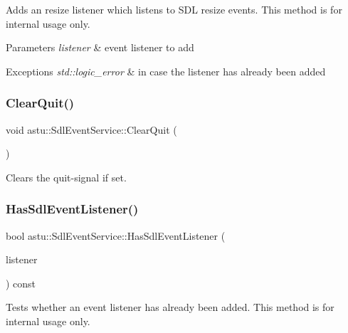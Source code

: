 Adds an resize listener which listens to S\+DL resize events. This method is for internal usage only.


\begin{DoxyParams}{Parameters}
{\em listener} & event listener to add \\
\hline
\end{DoxyParams}

\begin{DoxyExceptions}{Exceptions}
{\em std\+::logic\+\_\+error} & in case the listener has already been added \\
\hline
\end{DoxyExceptions}
\mbox{\label{classastu_1_1SdlEventService_afe744162d9089344bfc32f6d65111ff6}} 
\subsubsection{\texorpdfstring{Clear\+Quit()}{ClearQuit()}}
{\footnotesize\ttfamily void astu\+::\+Sdl\+Event\+Service\+::\+Clear\+Quit (\begin{DoxyParamCaption}{ }\end{DoxyParamCaption})}

Clears the quit-\/signal if set. \mbox{\label{classastu_1_1SdlEventService_a81cdf292655cea80f022673d276b5375}} 
\subsubsection{\texorpdfstring{Has\+Sdl\+Event\+Listener()}{HasSdlEventListener()}}
{\footnotesize\ttfamily bool astu\+::\+Sdl\+Event\+Service\+::\+Has\+Sdl\+Event\+Listener (\begin{DoxyParamCaption}\item[{I\+Sdl\+Event\+Listener \&}]{listener }\end{DoxyParamCaption}) const}

Tests whether an event listener has already been added. This method is for internal usage only.


